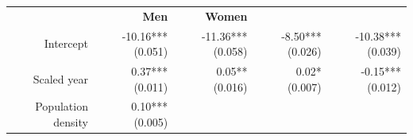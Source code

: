 \documentclass[]{article}
\begin{document}
\begin{longtable}[c]{@{}rrrrr@{}}
\begin{minipage}[t]{0.16\columnwidth}
\strut\end{minipage} &
\begin{minipage}[t]{0.18\columnwidth}\raggedleft\strut
\textbf{Men}
\strut\end{minipage} &
\begin{minipage}[t]{0.15\columnwidth}\raggedleft\strut
\textbf{Women}
\strut\end{minipage}\tabularnewline
\begin{minipage}[t]{0.17\columnwidth}\raggedleft\strut
Intercept
\strut\end{minipage} &
\begin{minipage}[t]{0.20\columnwidth}\raggedleft\strut
-10.16*** (0.051)
\strut\end{minipage} &
\begin{minipage}[t]{0.16\columnwidth}\raggedleft\strut
-11.36*** (0.058)
\strut\end{minipage} &
\begin{minipage}[t]{0.18\columnwidth}\raggedleft\strut
-8.50*** (0.026)
\strut\end{minipage} &
\begin{minipage}[t]{0.15\columnwidth}\raggedleft\strut
-10.38*** (0.039)
\strut\end{minipage}\tabularnewline
\begin{minipage}[t]{0.17\columnwidth}\raggedleft\strut
Scaled year
\strut\end{minipage} &
\begin{minipage}[t]{0.20\columnwidth}\raggedleft\strut
0.37*** (0.011)
\strut\end{minipage} &
\begin{minipage}[t]{0.16\columnwidth}\raggedleft\strut
0.05** (0.016)
\strut\end{minipage} &
\begin{minipage}[t]{0.18\columnwidth}\raggedleft\strut
0.02* (0.007)
\strut\end{minipage} &
\begin{minipage}[t]{0.15\columnwidth}\raggedleft\strut
-0.15*** (0.012)
\strut\end{minipage}\tabularnewline
\begin{minipage}[t]{0.17\columnwidth}\raggedleft\strut
Population density
\strut\end{minipage} &
\begin{minipage}[t]{0.20\columnwidth}\raggedleft\strut
0.10*** (0.005)
\strut\end{minipage} &
\begin{minipage}[t]{0.16\columnwidth}\raggedleft\strut

\end{minipage}
\end{longtable}
\end{document}
